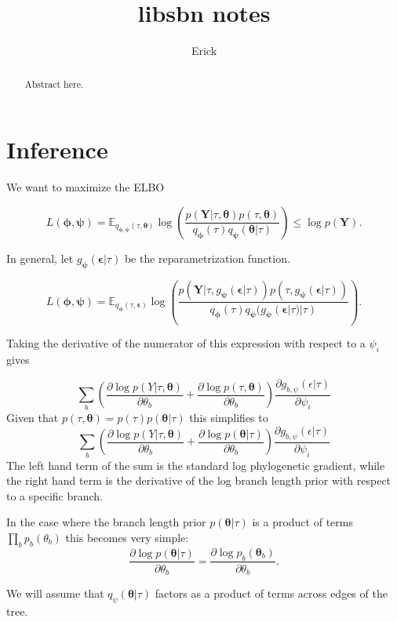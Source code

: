 \documentclass{article}
\title{libsbn notes}
\author{Erick}
\begin{document}
\maketitle

\begin{abstract}
Abstract here.
\end{abstract}


\section*{Inference}

We want to maximize the ELBO

\[
L(\bm{\phi},{\bm{\psi}}) = \mathbb{E}_{q_{\bm{\phi},{\bm{\psi}}}(\tau, \bm{\theta})}\log\left(\frac{p(\bm{Y}|\tau, \bm{\theta}) p(\tau, \bm{\theta})}{q_{\bm{\phi}}(\tau)q_{\bm{\psi}}(\bm{\theta}|\tau)}\right) \leq \log p(\bm{Y}).
\]

In general, let $g_{\bm{\psi}}(\bm{\epsilon}|\tau)$ be the reparametrization function.

\[
L(\bm{\phi},{\bm{\psi}}) = \mathbb{E}_{
    q_{\bm{\phi}}(\tau,\bm{\epsilon})}
    \log\left(\frac{p(\bm{Y}|\tau,g_{\bm{\psi}}(\bm{\epsilon}|\tau))p(\tau, g_{\bm{\psi}}(\bm{\epsilon}|\tau))}{q_{\bm{\phi}}(\tau)q_{\bm{\psi}}(g_{\bm{\psi}}(\bm{\epsilon}|\tau)|\tau)}\right).
\]

Taking the derivative of the numerator of this expression with respect to a $\psi_i$ gives

\[
    \sum_b
    \left(
        \frac{\partial \log p(Y | \tau, \bm\theta)}{\partial \theta_b}
        +
        \frac{\partial \log p(\tau, \bm\theta)}{\partial \theta_b}
    \right)
    \frac{\partial g_{b,\psi}(\epsilon | \tau)}{\partial \psi_i}
\]
Given that $p(\tau, \bm\theta) = p(\tau) p(\bm\theta | \tau)$ this simplifies to
\[
    \sum_b
    \left(
        \frac{\partial \log p(Y | \tau, \bm\theta)}{\partial \theta_b}
        +
        \frac{\partial \log p(\bm\theta | \tau)}{\partial \theta_b}
    \right)
    \frac{\partial g_{b,\psi}(\epsilon | \tau)}{\partial \psi_i}
\]
The left hand term of the sum is the standard log phylogenetic gradient, while the right hand term is the derivative of the log branch length prior with respect to a specific branch.

In the case where the branch length prior $p(\bm\theta | \tau)$ is a product of terms $\prod_b p_b(\theta_b)$ this becomes very simple:
\[
    \frac{\partial \log p(\bm\theta | \tau)}{\partial \theta_b} =
    \frac{\partial \log p_b(\bm\theta_b)}{\partial \theta_b}.
\]

We will assume that $q_\psi(\bm\theta | \tau)$ factors as a product of terms across edges of the tree.






\end{document}
